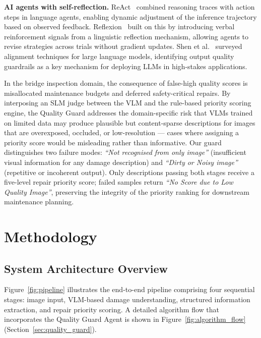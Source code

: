 \documentclass[twocolumn]{article}
\begin{document}
\textbf{AI agents with self-reflection.}
ReAct~\cite{yao2023react} combined reasoning traces with action steps
in language agents, enabling dynamic adjustment of the inference
trajectory based on observed feedback.
Reflexion~\cite{shinn2023reflexion} built on this by introducing verbal
reinforcement signals from a linguistic reflection mechanism, allowing
agents to revise strategies across trials without gradient updates.
Shen et al.~\cite{shen2023alignment} surveyed alignment techniques for
large language models, identifying output quality guardrails as a key
mechanism for deploying LLMs in high-stakes applications.

In the bridge inspection domain, the consequence of false-high quality
scores is misallocated maintenance budgets and deferred safety-critical
repairs.
By interposing an SLM judge between the VLM and the rule-based priority
scoring engine, the Quality Guard addresses the domain-specific risk that
VLMs trained on limited data may produce plausible but content-sparse
descriptions for images that are overexposed, occluded, or
low-resolution --- cases where assigning a priority score would be
misleading rather than informative.
Our guard distinguishes two failure modes: \textit{``Not recognised from
only image''} (insufficient visual information for any damage
description) and \textit{``Dirty or Noisy image''} (repetitive or
incoherent output). Only descriptions passing both stages receive a
five-level repair priority score; failed samples return
\textit{``No Score due to Low Quality Image''}, preserving the
integrity of the priority ranking for downstream maintenance planning.

\section{Methodology}
\label{sec:methodology}

\subsection{System Architecture Overview}

Figure~\ref{fig:pipeline} illustrates the end-to-end pipeline comprising four
sequential stages: image input, VLM-based damage understanding, structured
information extraction, and repair priority scoring.
A detailed algorithm flow that incorporates the Quality Guard Agent
is shown in Figure~\ref{fig:algorithm_flow} (Section~\ref{sec:quality_guard}).
\end{document}

